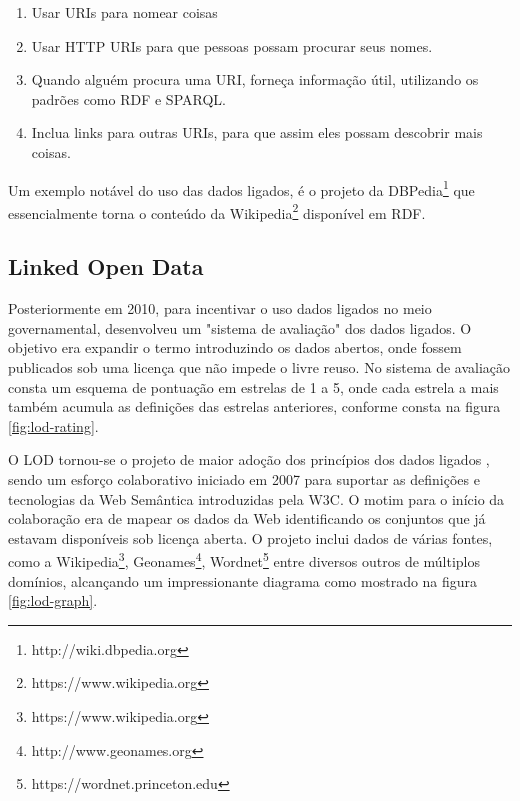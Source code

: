 \begin{enumerate}
	\item{Usar URIs para nomear coisas}
	\item{Usar \ac{HTTP} URIs para que pessoas possam procurar seus nomes.}
	\item{Quando alguém procura uma URI, forneça informação útil, utilizando os padrões como RDF e SPARQL.}
	\item{Inclua links para outras URIs, para que assim eles possam descobrir mais coisas.}	
\end{enumerate}

Um exemplo notável do uso das dados ligados, é o projeto da DBPedia\footnote{ http://wiki.dbpedia.org} que essencialmente torna o conteúdo da Wikipedia\footnote{https://www.wikipedia.org} disponível em RDF.

\subsection{Linked Open Data}

Posteriormente em 2010, para incentivar o uso dados ligados no meio governamental, \cite{LinkedData:2006} desenvolveu um "sistema de avaliação" dos dados ligados. O objetivo era expandir o termo introduzindo os dados abertos, onde fossem publicados sob uma licença que não impede o livre reuso. No sistema de avaliação consta um esquema de pontuação em estrelas de 1 a 5, onde cada estrela a mais também acumula as definições das estrelas anteriores, conforme consta na figura \ref{fig:lod-rating}.

O \ac{LOD} tornou-se o projeto de maior adoção dos princípios dos dados ligados \citep{Bizer2009}, sendo um esforço colaborativo iniciado em 2007 para suportar as definições e tecnologias da Web Semântica introduzidas pela W3C. O motim para o início da colaboração era de mapear os dados da Web identificando os conjuntos que já estavam disponíveis sob licença aberta. O projeto inclui dados de várias fontes, como a Wikipedia\footnote{https://www.wikipedia.org}, Geonames\footnote{http://www.geonames.org}, Wordnet\footnote{https://wordnet.princeton.edu} entre diversos outros de múltiplos domínios, alcançando um impressionante diagrama como mostrado na figura \ref{fig:lod-graph}.

